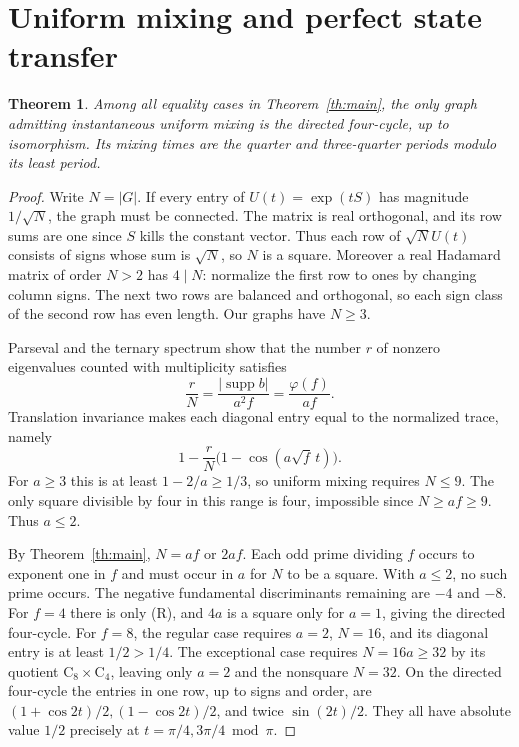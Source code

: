 \documentclass[11pt,letterpaper]{article}
\newtheorem{theorem}{Theorem}[section]
\newcommand{\supp}{\operatorname{supp}}\newcommand{\ord}{\operatorname{ord}}
\newcommand{\Cyc}{\mathrm C}
\newcommand{\rr}{\textup{(R)}}\newcommand{\ooe}{\textup{(O)}}\newcommand{\ee}{\textup{(E)}}
\begin{document}
\section{Uniform mixing and perfect state transfer}
\begin{theorem}\label{th:mixing}
Among all equality cases in Theorem~\ref{th:main}, the only graph admitting instantaneous uniform mixing is the directed four-cycle, up to isomorphism. Its mixing times are the quarter and three-quarter periods modulo its least period.
\end{theorem}
\begin{proof}
Write $N=|G|$. If every entry of $U(t)=\exp(tS)$ has magnitude $1/\sqrt N$, the graph must be connected. The matrix is real orthogonal, and its row sums are one since $S$ kills the constant vector. Thus each row of $\sqrt N U(t)$ consists of signs whose sum is $\sqrt N$, so $N$ is a square. Moreover a real Hadamard matrix of order $N>2$ has $4\mid N$: normalize the first row to ones by changing column signs. The next two rows are balanced and orthogonal, so each sign class of the second row has even length. Our graphs have $N\ge3$.

Parseval and the ternary spectrum show that the number $r$ of nonzero eigenvalues counted with multiplicity satisfies
\[
 \frac rN=\frac{|\supp b|}{a^2f}=\frac{\varphi(f)}{af}.
\]
Translation invariance makes each diagonal entry equal to the normalized trace, namely
\[
 1-\frac rN\bigl(1-\cos(a\sqrt f\,t)\bigr).
\]
For $a\ge3$ this is at least $1-2/a\ge1/3$, so uniform mixing requires $N\le9$. The only square divisible by four in this range is four, impossible since $N\ge af\ge9$. Thus $a\le2$.

By Theorem~\ref{th:main}, $N=af$ or $2af$. Each odd prime dividing $f$ occurs to exponent one in $f$ and must occur in $a$ for $N$ to be a square. With $a\le2$, no such prime occurs. The negative fundamental discriminants remaining are $-4$ and $-8$. For $f=4$ there is only \rr, and $4a$ is a square only for $a=1$, giving the directed four-cycle. For $f=8$, the regular case requires $a=2$, $N=16$, and its diagonal entry is at least $1/2>1/4$. The exceptional case requires $N=16a\ge32$ by its quotient $\Cyc_8\times\Cyc_4$, leaving only $a=2$ and the nonsquare $N=32$. On the directed four-cycle the entries in one row, up to signs and order, are $(1+\cos2t)/2,(1-\cos2t)/2$, and twice $\sin(2t)/2$. They all have absolute value $1/2$ precisely at $t=\pi/4,3\pi/4\bmod\pi$.
\end{proof}
\end{document}
